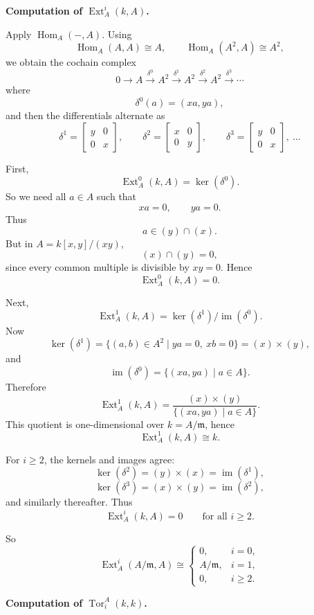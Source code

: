 \documentclass[12pt,a4paper]{article}
\theoremstyle{plain}
\theoremstyle{definition}      %
\begin{document}
\medskip

\textbf{Computation of \(\operatorname{Ext}_A^i(k,A)\).}

Apply \(\operatorname{Hom}_A(-,A)\). Using
\[
\operatorname{Hom}_A(A,A)\cong A,\qquad \operatorname{Hom}_A(A^2,A)\cong A^2,
\]
we obtain the cochain complex
\[
0\to A \xrightarrow{\delta^0} A^2 \xrightarrow{\delta^1} A^2 \xrightarrow{\delta^2} A^2 \xrightarrow{\delta^3}\cdots
\]
where
\[
\delta^0(a)=(xa,ya),
\]
and then the differentials alternate as
\[
\delta^1=
\begin{bmatrix}
	y&0\\
	0&x
\end{bmatrix},
\qquad
\delta^2=
\begin{bmatrix}
	x&0\\
	0&y
\end{bmatrix},
\qquad
\delta^3=
\begin{bmatrix}
	y&0\\
	0&x
\end{bmatrix},
\ \dots
\]

First,
\[
\operatorname{Ext}_A^0(k,A)=\ker(\delta^0).
\]
So we need all \(a\in A\) such that
\[
xa=0,\qquad ya=0.
\]
Thus
\[
a\in (y)\cap (x).
\]
But in \(A=k[x,y]/(xy)\),
\[
(x)\cap (y)=0,
\]
since every common multiple is divisible by \(xy=0\). Hence
\[
\operatorname{Ext}_A^0(k,A)=0.
\]

Next,
\[
\operatorname{Ext}_A^1(k,A)=\ker(\delta^1)/\operatorname{im}(\delta^0).
\]
Now
\[
\ker(\delta^1)=\{(a,b)\in A^2\mid ya=0,\ xb=0\}=(x)\times (y),
\]
and
\[
\operatorname{im}(\delta^0)=\{(xa,ya)\mid a\in A\}.
\]
Therefore
\[
\operatorname{Ext}_A^1(k,A)
=
\frac{(x)\times (y)}{\{(xa,ya)\mid a\in A\}}.
\]
This quotient is one-dimensional over \(k=A/\mathfrak m\), hence
\[
\operatorname{Ext}_A^1(k,A)\cong k.
\]

For \(i\ge 2\), the kernels and images agree:
\[
\ker(\delta^2)=(y)\times (x)=\operatorname{im}(\delta^1),
\]
\[
\ker(\delta^3)=(x)\times (y)=\operatorname{im}(\delta^2),
\]
and similarly thereafter. Thus
\[
\operatorname{Ext}_A^i(k,A)=0
\qquad\text{for all }i\ge 2.
\]

So
\[
\operatorname{Ext}_A^i(A/\mathfrak m,A)\cong
\begin{cases}
	0,& i=0,\\[1mm]
	A/\mathfrak m,& i=1,\\[1mm]
	0,& i\ge 2.
\end{cases}
\]

\medskip

\textbf{Computation of \(\operatorname{Tor}_i^A(k,k)\).}
\end{document}
